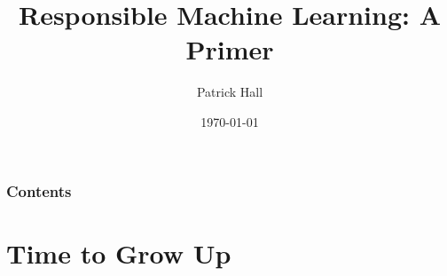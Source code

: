 \documentclass[11pt,
               aspectratio=169,
               hyperref={colorlinks}
               ]{beamer}
\author{Patrick Hall}
\title{Responsible Machine Learning: A Primer}
\institute{\href{https://www.h2o.ai}{H\textsubscript{2}O.ai}}
\date{\today}
\renewcommand*{\thefootnote}{\fnsymbol{footnote}}
\begin{document}
	
	\maketitle
	
	\begin{frame}
	
		\frametitle{Contents}
		
		\tableofcontents{}
		
	\end{frame}

\renewcommand*{\thefootnote}{\arabic{footnote}}

	\section{Time to Grow Up}

\end{document}
